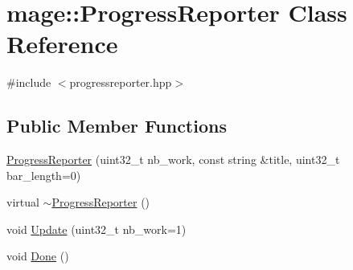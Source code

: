 \hypertarget{classmage_1_1_progress_reporter}{}\section{mage\+:\+:Progress\+Reporter Class Reference}
\label{classmage_1_1_progress_reporter}


{\ttfamily \#include $<$progressreporter.\+hpp$>$}

\subsection*{Public Member Functions}
\begin{DoxyCompactItemize}
\item 
\hyperlink{classmage_1_1_progress_reporter_a653b44699526baa17702cccd0fa58f78}{Progress\+Reporter} (uint32\+\_\+t nb\+\_\+work, const string \&title, uint32\+\_\+t bar\+\_\+length=0)
\item 
virtual \hyperlink{classmage_1_1_progress_reporter_aa543239c6dd4474a77cf4cf6904c1b26}{$\sim$\+Progress\+Reporter} ()
\item 
void \hyperlink{classmage_1_1_progress_reporter_a0a5f99f15e4152da9a3d6aadd888244a}{Update} (uint32\+\_\+t nb\+\_\+work=1)
\item 
void \hyperlink{classmage_1_1_progress_reporter_a11d758647ac2082bc296ab53a7454eaa}{Done} ()
\end{DoxyCompactItemize}
